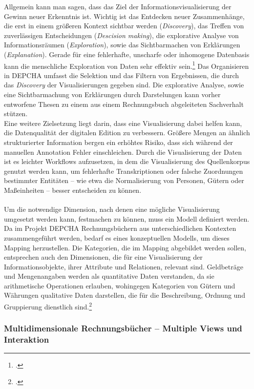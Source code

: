 \documentclass[12pt,a4paper]{article}
\begin{document}
Allgemein kann man sagen, dass das Ziel der Informationsvisualisierung der Gewinn neuer Erkenntnis ist. Wichtig ist das Entdecken neuer Zusammenhänge, die erst in einem größeren Kontext sichtbar werden (\textit{Discovery}), das Treffen von zuverlässigen Entscheidungen (\textit{Descision making}), die explorative Analyse von Informationsräumen (\textit{Exploration}), sowie das Sichtbarmachen von Erklärungen (\textit{Explanation}). Gerade für eine fehlerhafte, unscharfe oder inhomogene Datenbasis kann die menschliche Exploration von Daten sehr effektiv sein.\footcite[][S.439-444]{preim2010interaktive} Das Organisieren in DEPCHA umfasst die Selektion und das Filtern von Ergebnissen, die durch das \textit{Discovery} der Visualisierungen gegeben sind. Die explorative Analyse, sowie eine Sichtbarmachung von Erklärungen durch Darstelungen kann vorher entworfene Thesen zu einem aus einem Rechnungsbuch abgeleiteten Sachverhalt stützen.
\\
Eine weitere Zielsetzung liegt darin, dass eine Visualisierung dabei helfen kann, die Datenqualität der digitalen Edition zu verbessern. Größere Mengen an ähnlich strukturierter Information bergen ein erhöhtes Risiko, dass sich während der manuellen Annotation Fehler einschleichen. Durch die Visualisierung der Daten ist es leichter Workflows aufzusetzen, in dem die Visualisierung des Quellenkorpus genutzt werden kann, um fehlerhafte Transkriptionen oder falsche Zuordnungen bestimmter Entitäten -- wie etwa die Normalisierung von Personen, Gütern oder Maßeinheiten -- besser entscheiden zu können.
\\
\\
Um die notwendige Dimension, nach denen eine mögliche Visualisierung umgesetzt werden kann, festmachen zu können, muss ein Modell definiert werden. Da im Projekt DEPCHA Rechnungsbüchern aus unterschiedlichen Kontexten zusammengeführt werden, bedarf es eines konzeptuellen Modells, um dieses Mapping herzustellen. Die Kategorien, die im Mapping abgebildet werden sollen, entsprechen auch den Dimensionen, die für eine Visualisierung der Informationsobjekte, ihrer Attribute und Relationen, relevant sind. Geldbeträge und Mengenangaben werden als quantitative Daten verstanden, da sie arithmetische Operationen erlauben, wohingegen Kategorien von Gütern und Währungen qualitative Daten darstellen, die für die Beschreibung, Ordnung und Gruppierung dienstlich sind.\footcite[][S.448-450]{preim2010interaktive}

\subsubsection{Multidimensionale Rechnungsbücher – Multiple Views und Interaktion}
\end{document}
